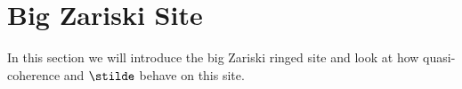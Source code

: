 \section{Big Zariski Site}
In this section we will introduce the big Zariski ringed site
and look at how quasi-coherence and $\stilde$ behave on this site.






